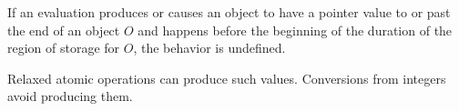 \pnum
If an evaluation produces or causes an object
to have a pointer value
to or past the end of an object $O$ and
happens before the beginning of the duration
of the region of storage for $O$,
the behavior is undefined.
%
%
%
%
%
\begin{note}
Relaxed atomic operations can produce such values.
Conversions from integers avoid producing them.
\end{note}

